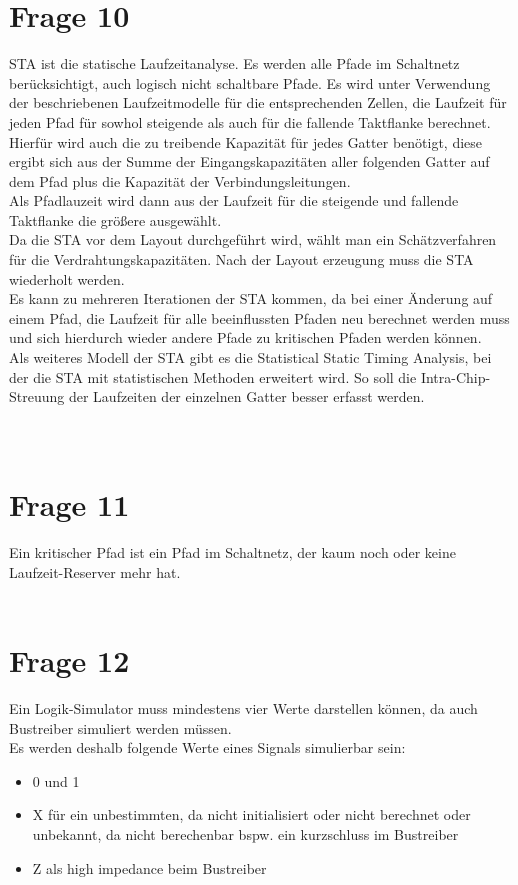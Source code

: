 \documentclass[a4paper]{scrartcl}
\begin{document}
\section*{Frage 10}
STA ist die statische Laufzeitanalyse. Es werden alle Pfade im Schaltnetz berücksichtigt, auch logisch nicht schaltbare Pfade. Es wird unter Verwendung der beschriebenen Laufzeitmodelle für die entsprechenden Zellen, die Laufzeit für jeden Pfad für sowhol steigende als auch für die fallende Taktflanke berechnet. Hierfür wird auch die zu treibende Kapazität für jedes Gatter benötigt, diese ergibt sich aus der Summe der Eingangskapazitäten aller folgenden Gatter auf dem Pfad plus die Kapazität der Verbindungsleitungen.\\
Als Pfadlauzeit wird dann aus der Laufzeit für die steigende und fallende Taktflanke die größere ausgewählt.\\
Da die STA vor dem Layout durchgeführt wird, wählt man ein Schätzverfahren für die Verdrahtungskapazitäten. Nach der Layout erzeugung muss die STA wiederholt werden.\\
Es kann zu mehreren Iterationen der STA kommen, da bei einer Änderung auf einem Pfad, die Laufzeit für alle beeinflussten Pfaden neu berechnet werden muss und sich hierdurch wieder andere Pfade zu kritischen Pfaden werden können.\\
Als weiteres Modell der STA gibt es die Statistical Static Timing Analysis, bei der die STA mit statistischen Methoden erweitert wird. So soll die Intra-Chip-Streuung der Laufzeiten der einzelnen Gatter besser erfasst werden.\\
~\\
~\\
\section*{Frage 11}
Ein kritischer Pfad ist ein Pfad im Schaltnetz, der kaum noch oder keine Laufzeit-Reserver mehr hat.
~\\
~\\
\section*{Frage 12}
Ein Logik-Simulator muss mindestens vier Werte darstellen können, da auch Bustreiber simuliert werden müssen.\\
Es werden deshalb folgende Werte eines Signals simulierbar sein:
\begin{itemize}
	\item 0 und 1
	\item X für ein unbestimmten, da nicht initialisiert oder nicht berechnet oder unbekannt, da nicht berechenbar bspw. ein kurzschluss im Bustreiber
	\item Z als high impedance  beim Bustreiber
\end{itemize}
~\\
~\\
\end{document}
